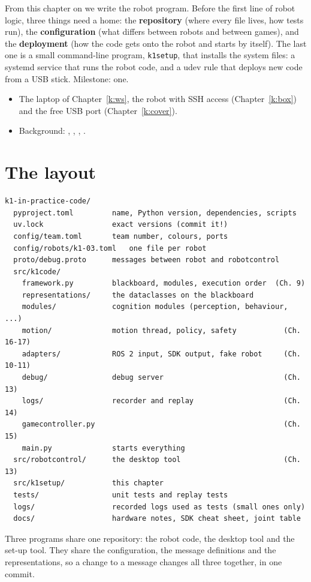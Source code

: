 \label{k:repo}

From this chapter on we write the robot program. Before the first line of robot logic, three things need a home: the \textbf{repository} (where every file lives, how tests run), the \textbf{configuration} (what differs between robots and between games), and the \textbf{deployment} (how the code gets onto the robot and starts by itself). The last one is a small command-line program, \texttt{k1setup}, that installs the system files: a systemd service that runs the robot code, and a udev rule that deploys new code from a USB stick. Milestone: one.

\begin{needbox}
\begin{itemize}[nosep]
  \item The laptop of Chapter~\ref{k:ws}, the robot with SSH access (Chapter~\ref{k:box}) and the free USB port (Chapter~\ref{k:cover}).
  \item Background: , , , .
\end{itemize}
\end{needbox}

\section*{The layout}
\begin{verbatim}
k1-in-practice-code/
  pyproject.toml         name, Python version, dependencies, scripts
  uv.lock                exact versions (commit it!)
  config/team.toml       team number, colours, ports
  config/robots/k1-03.toml   one file per robot
  proto/debug.proto      messages between robot and robotcontrol
  src/k1code/
    framework.py         blackboard, modules, execution order  (Ch. 9)
    representations/     the dataclasses on the blackboard
    modules/             cognition modules (perception, behaviour, ...)
    motion/              motion thread, policy, safety           (Ch. 16-17)
    adapters/            ROS 2 input, SDK output, fake robot     (Ch. 10-11)
    debug/               debug server                            (Ch. 13)
    logs/                recorder and replay                     (Ch. 14)
    gamecontroller.py                                            (Ch. 15)
    main.py              starts everything
  src/robotcontrol/      the desktop tool                        (Ch. 13)
  src/k1setup/           this chapter
  tests/                 unit tests and replay tests
  logs/                  recorded logs used as tests (small ones only)
  docs/                  hardware notes, SDK cheat sheet, joint table
\end{verbatim}
Three programs share one repository: the robot code, the desktop tool and the set-up tool. They share the configuration, the message definitions and the representations, so a change to a message changes all three together, in one commit.

